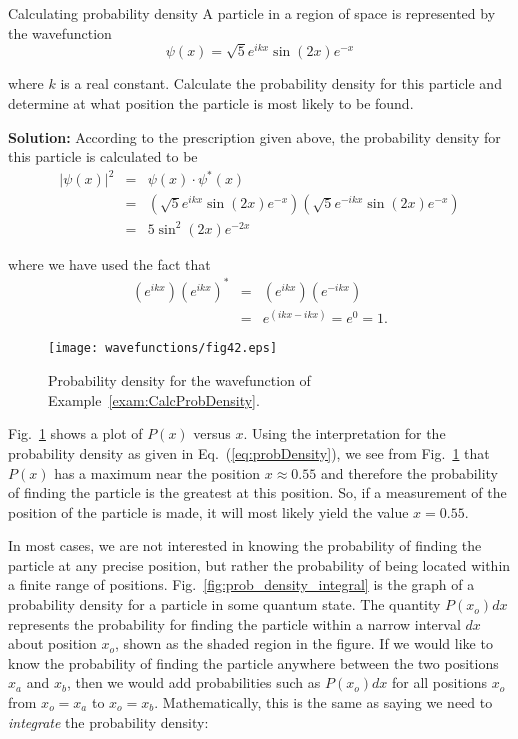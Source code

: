 \begin{example}{Calculating probability density}
\label{exam:CalcProbDensity}
A particle in a region of space is represented by the wavefunction
\begin{equation}
\psi(x) = \sqrt{5} e^{ikx} \sin(2x) e^{-x} \nonumber
\end{equation}

\noindent where $k$ is a real constant.  Calculate the probability
density for this particle and determine at what position the particle
is most likely to be found.

{\bf Solution:} According to the prescription given above, the
probability density for this particle is calculated to be
\begin{eqnarray}
\left| \psi(x) \right| ^2 & = & \psi(x) \cdot \psi^*(x) \nonumber \\
 & = & \left( \sqrt{5} e^{ikx} \sin(2x) e^{-x} \right) \left( \sqrt{5} e^{-ikx} \sin(2x) e^{-x} \right) \nonumber \\
 & = & 5 \sin^2(2x) e^{-2x} \nonumber
\end{eqnarray}

\noindent where we have used the fact that
\begin{eqnarray}
(e^{ikx}) (e^{ikx})^* &=& (e^{ikx}) (e^{-ikx}) \nonumber \\
&=& e^{(ikx-ikx)} = e^0 = 1. \nonumber
\end{eqnarray}

\begin{figure}[!hb]
\begin{center}
\texttt{[image: wavefunctions/fig42.eps]}
\end{center}
\caption{Probability density for the wavefunction of Example~\ref{exam:CalcProbDensity}.}
\label{fig:prob_density_example}
\end{figure}

Fig.~\ref{fig:prob_density_example} shows a plot of $P(x)$ versus
$x$. Using the interpretation for the probability density as given in
Eq.~(\ref{eq:probDensity}), we see from
Fig.~\ref{fig:prob_density_example} that $P(x)$ has a maximum near the
position $x \approx 0.55$ and therefore the probability of finding the
particle is the greatest at this position. So, if a measurement of the
position of the particle is made, it will most likely yield the value
$x = 0.55$.
\end{example}

In most cases, we are not interested in knowing the probability of
finding the particle at any precise position, but rather the
probability of being located within a finite range of positions.
Fig.~\ref{fig:prob_density_integral} is the graph of a probability
density for a particle in some quantum state.  The quantity $P(x_o)
dx$ represents the probability for finding the particle within a
narrow interval $dx$ about position $x_o$, shown as the shaded region
in the figure.  If we would like to know the probability of finding
the particle anywhere between the two positions $x_a$ and $x_b$, then
we would add probabilities such as $P(x_o) dx$ for all positions $x_o$
from $x_o = x_a$ to $x_o = x_b$.  Mathematically, this is the same as saying
we need to {\em integrate} the probability density:

